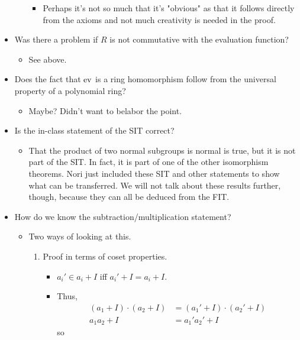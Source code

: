 \documentclass[../notes.tex]{subfiles}
\begin{document}
\begin{itemize}
\begin{itemize}
\begin{itemize}
            \item Perhaps it's not so much that it's "obvious" as that it follows directly from the axioms and not much creativity is needed in the proof.
        \end{itemize}
    \end{itemize}
    \item Was there a problem if $R$ is not commutative with the evaluation function?
    \begin{itemize}
        \item See above.
    \end{itemize}
    \item Does the fact that $\operatorname{ev}$ is a ring homomorphism follow from the universal property of a polynomial ring?
    \begin{itemize}
        \item Maybe? Didn't want to belabor the point.
    \end{itemize}
    \item Is the in-class statement of the SIT correct?
    \begin{itemize}
        \item That the product of two normal subgroups is normal is true, but it is not part of the SIT. In fact, it is part of one of the other isomorphism theorems. Nori just included these SIT and other statements to show what can be transferred. We will not talk about these results further, though, because they can all be deduced from the FIT.
    \end{itemize}
    \item How do we know the subtraction/multiplication statement?
    \begin{itemize}
        \item Two ways of looking at this.
        \begin{enumerate}
            \item Proof in terms of coset properties.
            \begin{itemize}
                \item $a_i'\in a_i+I$ iff $a_i'+I=a_i+I$.
                \item Thus,
                \begin{align*}
                    (a_1+I)\cdot(a_2+I) &= (a_1'+I)\cdot(a_2'+I)\\
                    a_1a_2+I &= a_1'a_2'+I
                \end{align*}
                so
                \begin{equation*}

\end{equation*}
\end{itemize}
\end{enumerate}
\end{itemize}
\end{itemize}
\end{document}
